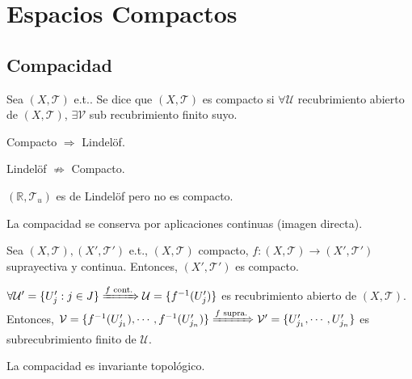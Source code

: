 \chapter{Espacios Compactos}

\section{Compacidad}

\begin{defn}[Compacto]
  Sea $ ( X, \mathcal{T} )$ e.t.. Se dice que $(  X, \mathcal{T} )$ es compacto si $\forall \mathcal{U}$ recubrimiento abierto de $( X, \mathcal{T} )$, $\exists \mathcal{V}$ sub recubrimiento finito suyo.
\end{defn}

\begin{obs}
  Compacto $\Rightarrow$ Lindelöf.
\end{obs}

\begin{obs}
  Lindelöf $\not \Rightarrow$ Compacto.
\end{obs}

\begin{ejm}
  $( \mathbb{R}, \mathcal{T}_{u} )$ es de Lindelöf pero no es compacto.
\end{ejm}

\begin{obs}
  La compacidad se conserva por aplicaciones continuas (imagen directa).
\end{obs}

\begin{prop}
  Sea $( X, \mathcal{T} ), ( X', \mathcal{T}' )$ e.t., $( X, \mathcal{T} )$ compacto, $f : ( X, \mathcal{T} ) \to ( X', \mathcal{T}' )$ suprayectiva y continua. Entonces, $( X', \mathcal{T}' )$ es compacto.
\end{prop}

\begin{dem}
  $\forall \mathcal{U}' = \{  U_{j}' : j \in J \} \xRightarrow[]{ f \text{ cont.} } \mathcal{U} = \{ f^{-1}(U_{j}') \}$ es recubrimiento abierto de $( X, \mathcal{T} )$. Entonces, $\mathcal{V} = \{ f^{-1}(U'_{j_{1}}), \cdots, f^{-1}(U_{j_{n}}') \} \xRightarrow[]{ f \text{ supra.} } \mathcal{V}' = \{  U_{j_{1}}', \cdots, U_{j_{n}}' \}$ es subrecubrimiento finito de $\mathcal{U}$.
\end{dem}

\begin{cor}
  La compacidad es invariante topológico.
\end{cor}

